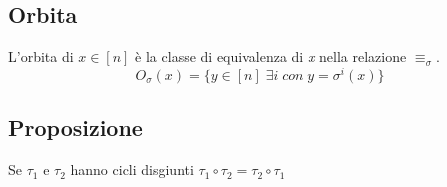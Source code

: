 \subsection{Orbita}
L'orbita di \(x\in [n]\) è la classe di equivalenza di \textit{x} nella relazione \(\equiv _\sigma\).
\[O_\sigma (x) =\{y\in [n]\;\exists i\;con\;y=\sigma ^i(x)\}\]

\subsection{Proposizione}
Se \(\tau _1\) e \(\tau _2\) hanno cicli disgiunti \(\tau _1\circ\tau _2 = \tau _2\circ\tau _1\)
